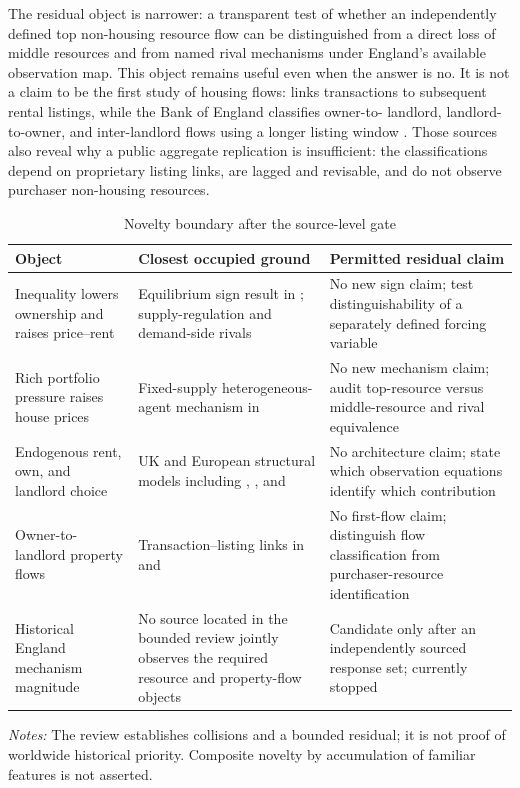 \documentclass[11pt]{article}
\begin{document}
The residual object is narrower: a transparent test of whether an independently
defined top non-housing resource flow can be distinguished from a direct loss of
middle resources and from named rival mechanisms under England's available
observation map. This object remains useful even when the answer is no. It is not
a claim to be the first study of housing flows: \citet{bracke2021} links transactions
to subsequent rental listings, while the Bank of England classifies owner-to-
landlord, landlord-to-owner, and inter-landlord flows using a longer listing window
\citep{bankofengland2023flows}. Those sources also reveal why a public aggregate
replication is insufficient: the classifications depend on proprietary listing
links, are lagged and revisable, and do not observe purchaser non-housing resources.

\begin{table}[t]
\centering
\caption{Novelty boundary after the source-level gate}
\label{tab:novelty}
\small
\begin{tabularx}{\textwidth}{@{}p{}X p{}@{}}
\toprule
Object & Closest occupied ground & Permitted residual claim \\
\midrule
Inequality lowers ownership and raises price--rent & Equilibrium sign result in \citet{head2023}; supply-regulation and demand-side rivals & No new sign claim; test distinguishability of a separately defined forcing variable \\
Rich portfolio pressure raises house prices & Fixed-supply heterogeneous-agent mechanism in \citet{zhang2015} & No new mechanism claim; audit top-resource versus middle-resource and rival equivalence \\
Endogenous rent, own, and landlord choice & UK and European structural models including \citet{moktan2025}, \citet{albuquerque2025}, and \citet{cima2026} & No architecture claim; state which observation equations identify which contribution \\
Owner-to-landlord property flows & Transaction--listing links in \citet{bracke2021} and \citet{bankofengland2023flows} & No first-flow claim; distinguish flow classification from purchaser-resource identification \\
Historical England mechanism magnitude & No source located in the bounded review jointly observes the required resource and property-flow objects & Candidate only after an independently sourced response set; currently stopped \\
\bottomrule
\end{tabularx}
\parbox{0.96\textwidth}{\footnotesize
\emph{Notes:} The review establishes collisions and a bounded residual; it is
not proof of worldwide historical priority. Composite novelty by accumulation
of familiar features is not asserted.}
\end{table}
\end{document}
